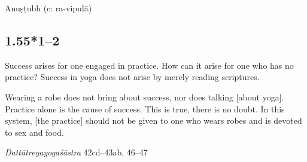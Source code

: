 \begin{ekdosis}
\begin{philcomm}[hp01_055]
\end{philcomm}

\begin{metre}[hp01_055]
Anuṣṭubh (c: ra-vipulā)
\end{metre}

\subsection*{1.55*1--2}
\begin{translation}[hp01_055_1]
Success arises for one engaged in practice. How can it arise for one who has no practice? Success in yoga does not arise by merely reading scriptures.
\end{translation}

\begin{translation}[hp01_055_2]
Wearing a robe does not bring about success, nor does talking [about yoga]. Practice alone is the cause of success. This is true, there is no doubt. In this system, [the practice] should not be given to one who wears robes and is devoted to sex and food.
\end{translation}

\begin{sources}[hp01_055_1]
\emph{Dattātreyayogaśāstra} 42cd–43ab, 46–47


\end{sources}
\end{ekdosis}
